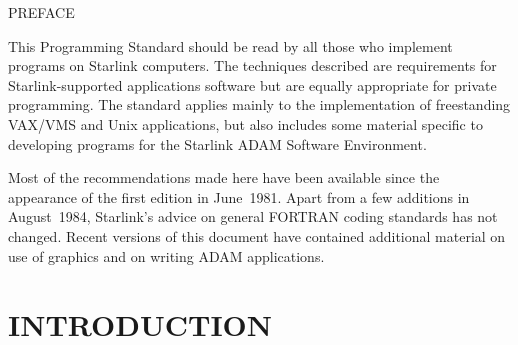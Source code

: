 \documentclass[twoside,11pt]{article}
\newcommand{\stardocinitials}  {SGP}
\newcommand{\stardocnumber}    {16.10}
\newcommand{\stardocname}{\stardocinitials /\stardocnumber}
\newenvironment{latexonly}{}{}
\newcommand{\html}[1]{}
\newcommand{\xlabel}[1]{}
\renewcommand{\_}{{\tt\char'137}}
\begin{document}
\newpage

\begin{latexonly}\begin{center}
\vspace{10mm}
PREFACE
\end{center}
\end{latexonly}
\html{\section{\xlabel{preface}PREFACE}}

This Programming Standard should be read by all those who implement
programs on Starlink computers.  The techniques described are
requirements for Starlink-supported applications software but are equally
appropriate for private programming.  The standard applies mainly
to the implementation of freestanding VAX/VMS and Unix
applications, but also includes some material specific to developing
programs for the Starlink ADAM Software Environment.

Most of the recommendations made here have been available since
the appearance of the first edition in June~1981.
Apart from a few additions in August~1984, Starlink's advice
on general FORTRAN coding standards has not changed.
Recent versions of this document
have contained additional material on use
of graphics and on writing ADAM applications.

\newpage
\section{INTRODUCTION}
\end{document}
